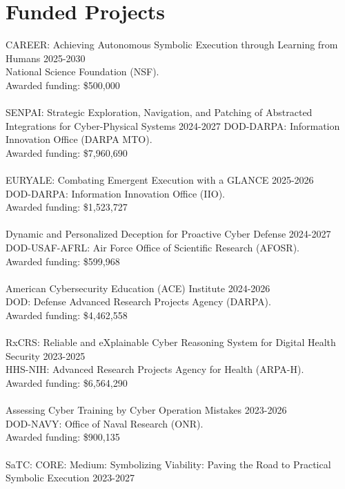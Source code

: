 \section{Funded Projects}
CAREER: Achieving Autonomous Symbolic Execution through Learning from Humans \hfill{2025-2030} \\
National Science Foundation (NSF). \\
Awarded funding: \$500,000 
\\\\
SENPAI: Strategic Exploration, Navigation, and Patching of Abstracted Integrations for Cyber-Physical Systems	\hfill{2024-2027}
DOD-DARPA: Information Innovation Office (DARPA MTO). \\
Awarded funding: 	\$7,960,690 
\\\\
EURYALE: Combating Emergent Execution with a GLANCE \hfill{2025-2026} \\
DOD-DARPA: Information Innovation Office (IIO). \\
Awarded funding: \$1,523,727 \\
\\
Dynamic and Personalized Deception for Proactive Cyber Defense \hfill{2024-2027} \\
DOD-USAF-AFRL: Air Force Office of Scientific Research (AFOSR). \\
Awarded funding: \$599,968 \\
\\
American Cybersecurity Education (ACE) Institute \hfill{2024-2026} \\
DOD: Defense Advanced Research Projects Agency (DARPA). \\
Awarded funding: \$4,462,558 \\
\\
RxCRS: Reliable and eXplainable Cyber Reasoning System for Digital Health Security \hfill{2023-2025} \\
HHS-NIH: Advanced Research Projects Agency for Health (ARPA-H). \\
Awarded funding: \$6,564,290 \\
\\
Assessing Cyber Training by Cyber Operation Mistakes \hfill{2023-2026} \\
DOD-NAVY: Office of Naval Research (ONR). \\
Awarded funding: \$900,135 \\
\\
SaTC: CORE: Medium: Symbolizing Viability: Paving the Road to Practical Symbolic Execution \hfill{2023-2027} \\
